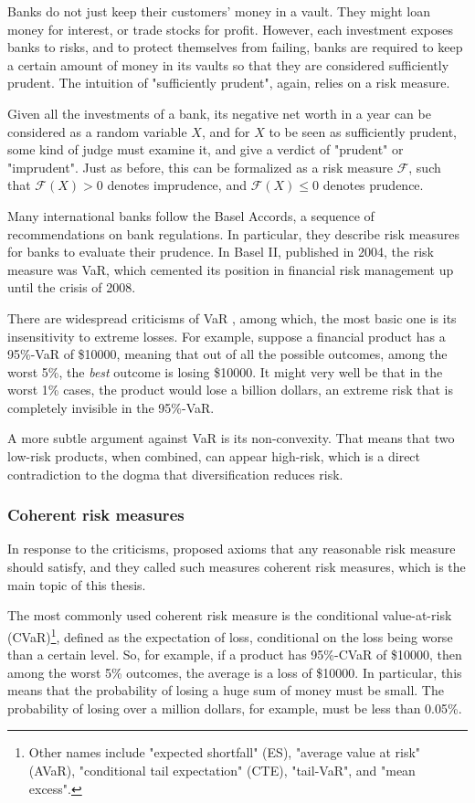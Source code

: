 Banks do not just keep their customers' money in a vault. They might loan money for interest, or trade stocks for profit. However, each investment exposes banks to risks, and to protect themselves from failing, banks are required to keep a certain amount of money in its vaults so that they are considered sufficiently prudent. The intuition of "sufficiently prudent", again, relies on a risk measure. 

Given all the investments of a bank, its negative net worth in a year can be considered as a random variable $X$, and for $X$ to be seen as sufficiently prudent, some kind of judge must examine it, and give a verdict of "prudent" or "imprudent". Just as before, this can be formalized as a risk measure $\mathcal{F}$, such that $\mathcal{F}(X)> 0$ denotes imprudence, and $\mathcal{F}(X)\le 0$ denotes prudence.

Many international banks follow the Basel Accords, a sequence of recommendations on bank regulations. In particular, they describe risk measures for banks to evaluate their prudence. In Basel II, published in 2004, the risk measure was VaR, which cemented its position in financial risk management up until the crisis of 2008.

There are widespread criticisms of VaR \cite{danielssonAcademicResponseBasel2001}, among which, the most basic one is its insensitivity to extreme losses. For example, suppose a financial product has a 95\%-VaR of \$10000, meaning that out of all the possible outcomes, among the worst 5\%, the \textit{best} outcome is losing \$10000. It might very well be that in the worst 1\% cases, the product would lose a billion dollars, an extreme risk that is completely invisible in the 95\%-VaR.

A more subtle argument against VaR is its non-convexity. That means that two low-risk products, when combined, can appear high-risk, which is a direct contradiction to the dogma that diversification reduces risk.

\subsubsection{Coherent risk measures}
In response to the criticisms, \cite{artznerCoherentMeasuresRisk1999} proposed axioms that any reasonable risk measure should satisfy, and they called such measures coherent risk measures, which is the main topic of this thesis.

The most commonly used coherent risk measure is the conditional value-at-risk (CVaR)\footnote{Other names include "expected shortfall" (ES), "average value at risk" (AVaR), "conditional tail expectation" (CTE), "tail-VaR", and "mean excess".}, defined as the expectation of loss, conditional on the loss being worse than a certain level. So, for example, if a product has 95\%-CVaR of \$10000, then among the worst 5\% outcomes, the average is a loss of \$10000. In particular, this means that the probability of losing a huge sum of money must be small. The probability of losing over a million dollars, for example, must be less than 0.05\%.

